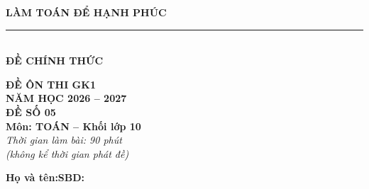 \documentclass[12pt,a4paper]{article}
\begin{document}
\noindent
\begin{minipage}[c]{0.38\textwidth}
    \centering
    \textbf{LÀM TOÁN ĐỂ HẠNH PHÚC}\\[-2pt]
    \rule{3.2cm}{0.6pt}\\[4pt]
    \textbf{ĐỀ CHÍNH THỨC}
\end{minipage}\hfill
\begin{minipage}[c]{0.35\textwidth}
    \centering
    \textbf{ĐỀ ÔN THI GK1}\\
    \textbf{NĂM HỌC 2026 -- 2027}\\[2pt]
    \textbf{ĐỀ SỐ 05}\\
    \textbf{Môn: TOÁN -- Khối lớp 10}\\
    \textit{\small Thời gian làm bài: 90 phút\\(không kể thời gian phát đề)}
\end{minipage}

\vspace{0.2cm}
\noindent
\begin{minipage}[b]{0.78\textwidth}
    \textbf{Họ và tên:}\dotfill\textbf{SBD:}\makebox[3.5cm]{\dotfill}
\end{minipage}\hfill
\begin{minipage}[b]{0.20\textwidth}
    \hfill
    \setlength{\fboxrule}{0.8pt}%
\end{minipage}
\vspace{0.2cm}
\end{document}
